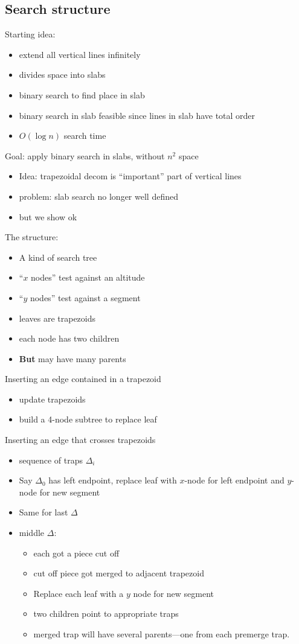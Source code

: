 \documentclass{article}
\begin{document}
\subsection*{Search structure}

Starting idea: 
\begin{itemize}
\item extend all vertical lines infinitely
\item divides space into slabs
\item binary search to find place in slab
\item binary search in slab feasible since lines in slab have total
  order
\item $O(\log n)$ search time
\end{itemize}

Goal: apply binary search in slabs, without $n^2$ space
\begin{itemize}
\item Idea: trapezoidal decom is ``important'' part of vertical lines
\item problem: slab search no longer well defined
\item but we show ok
\end{itemize}

The structure:
\begin{itemize}
\item A kind of search tree
\item ``$x$ nodes'' test against an altitude
\item ``$y$ nodes'' test against a segment
\item leaves are trapezoids
\item each node has two children
\item \textbf{But} may have many parents
\end{itemize}

Inserting an edge contained in a trapezoid
\begin{itemize}
\item update trapezoids
\item build a 4-node subtree to replace leaf
\end{itemize}

Inserting an edge that crosses trapezoids
\begin{itemize}
\item sequence of traps $\Delta_i$
\item Say $\Delta_0$  has left endpoint, replace leaf with $x$-node for
  left endpoint and $y$-node for new segment
\item Same for last $\Delta$
\item middle $\Delta$: 
\begin{itemize}
\item each got a piece cut off
\item cut off piece got merged to adjacent trapezoid
\item Replace each leaf with a $y$ node for new segment
\item two children point to appropriate traps
\item merged trap will have several parents---one from each premerge trap.
\end{itemize}
\end{itemize}
\end{document}
